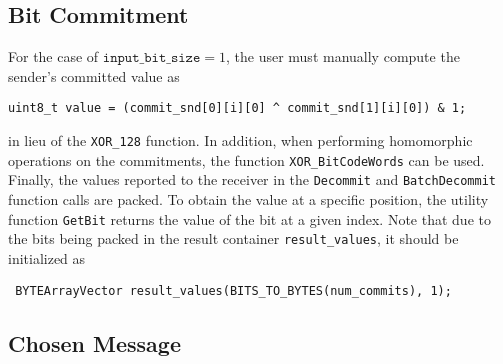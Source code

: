 \subsection{Bit Commitment}

For the case of $\texttt{input\_bit\_size} =1$, the user must manually compute the sender's committed value as 
\begin{lstlisting}     
uint8_t value = (commit_snd[0][i][0] ^ commit_snd[1][i][0]) & 1;
\end{lstlisting}
in lieu of the \texttt{XOR\_128} function. In addition, when performing homomorphic operations on the commitments, the function \texttt{XOR\_BitCodeWords} can be used. Finally, the values reported to the receiver in the \texttt{Decommit} and \texttt{BatchDecommit} function calls are packed. To obtain the value at a specific position, the utility function \texttt{GetBit} returns the value of the bit at a given index. Note that due to the bits being packed in the result container \texttt{result\_values}, it should be initialized as
\begin{lstlisting}     
 BYTEArrayVector result_values(BITS_TO_BYTES(num_commits), 1);
\end{lstlisting}

\subsection{Chosen Message}

